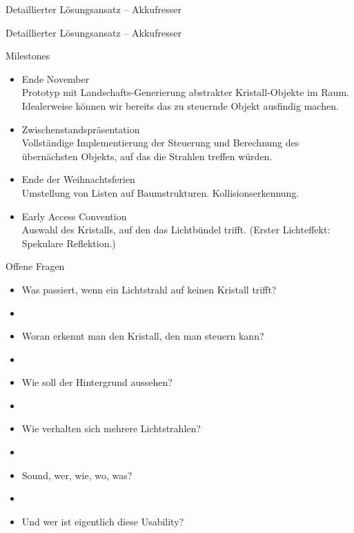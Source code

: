 \begin{frame}
{Detaillierter Lösungsansatz -- Akkufresser}
	
\end{frame}
\begin{frame}
{Detaillierter Lösungsansatz -- Akkufresser}
	
\end{frame}




\begin{frame}{Milestones}
	\begin{itemize}
		
		

		\item \textcolor{evap@lightgreen}{Ende November\\
			Prototyp mit Landschafts-Generierung abstrakter \glqq Kristall\grqq -Objekte im Raum. Idealerweise können wir bereits das zu steuernde Objekt ausfindig machen.}
			
		\item \textcolor{evap@yellow}{Zwischenstandspräsentation\\
			Vollständige Implementierung der Steuerung und Berechnung des übernächsten Objekts, auf das die Strahlen treffen würden.}
			
		\item Ende der Weihnachtsferien\\
			Umstellung von Listen auf Baumstrukturen. Kollisionserkennung.
		\item Early Access Convention\\
			Auswahl des Kristalls, auf den das Lichtbündel trifft. (Erster Lichteffekt: Spekulare Reflektion.)
	\end{itemize}
\end{frame}

\begin{frame}{Offene Fragen}
	\begin{itemize}
		\item Was passiert, wenn ein Lichtstrahl auf keinen Kristall trifft?
		\item[]
		\item Woran erkennt man den Kristall, den man steuern kann?
		\item[]
		\item Wie soll der Hintergrund aussehen?
		\item[]
		\item Wie verhalten sich mehrere Lichtstrahlen?
		\item[]		
		\item Sound, wer, wie, wo, was?
		\item[]		
		\item Und wer ist eigentlich diese Usability?
	\end{itemize}

\end{frame}

\nocite{*}



